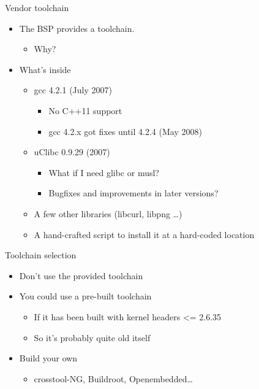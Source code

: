 \documentclass[xetex,table,aspectratio=169]{beamer}
\begin{document}
\begin{frame}{Vendor toolchain}
  \begin{itemize}
  \item The BSP provides a toolchain.
    \begin{itemize}
    \item Why?
    \end{itemize}
  \item What's inside
    \begin{itemize}
    \item gcc 4.2.1 (July 2007)
      \begin{itemize}
      \item No C++11 support
      \item gcc 4.2.x got fixes until 4.2.4 (May 2008)
      \end{itemize}
    \item uClibc 0.9.29 (2007)
      \begin{itemize}
      \item What if I need glibc or musl?
      \item Bugfixes and improvements in later versions?
      \end{itemize}
    \item A few other libraries (libcurl, libpng \dots)
    \item A hand-crafted script to install it at a hard-coded location
    \end{itemize}
  \end{itemize}
\end{frame}

\begin{frame}{Toolchain selection}
  \begin{itemize}
  \item Don't use the provided toolchain
  \item You could use a pre-built toolchain
    \begin{itemize}
    \item If it has been built with kernel headers <= 2.6.35
    \item So it's probably quite old itself
    \end{itemize}
  \item Build your own
    \begin{itemize}
    \item crosstool-NG, Buildroot, Openembedded\dots
    \end{itemize}
  \end{itemize}
\end{frame}
\end{document}
